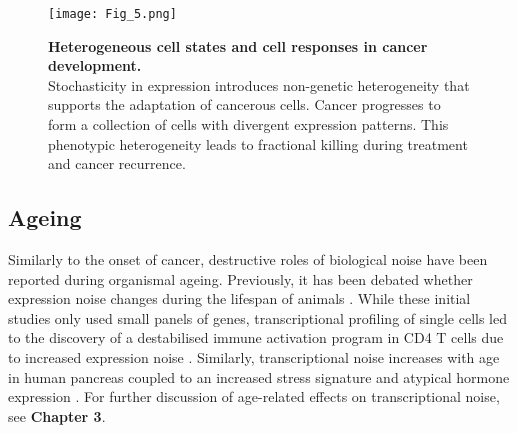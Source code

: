 \begin{figure}[!h]
\centering
\texttt{[image: Fig\_5.png]}
\caption[Heterogeneous cell states and cell responses in cancer development]{\textbf{Heterogeneous cell states and cell responses in cancer development.}\\
Stochasticity in expression introduces non-genetic heterogeneity that supports the adaptation of cancerous cells. Cancer progresses to form a collection of cells with divergent expression patterns. This phenotypic heterogeneity leads to fractional killing during treatment and cancer recurrence.}
\label{fig0:cancer}
\end{figure}

\newpage

\subsection{Ageing}

Similarly to the onset of cancer, destructive roles of biological noise have been reported during organismal ageing. Previously, it has been debated whether expression noise changes during the lifespan of animals \cite{Bahar2006, Warren2007}. While these initial studies only used small panels of genes, transcriptional profiling of single cells led to the discovery of a destabilised immune activation program in CD4\plus{} T cells due to increased expression noise \cite{Martinez-jimenez2017}. Similarly, transcriptional noise increases with age in human pancreas coupled to an increased stress signature and atypical hormone expression \citep{Enge2017}. For further discussion of age-related effects on transcriptional noise, see \textbf{Chapter 3}. \\



